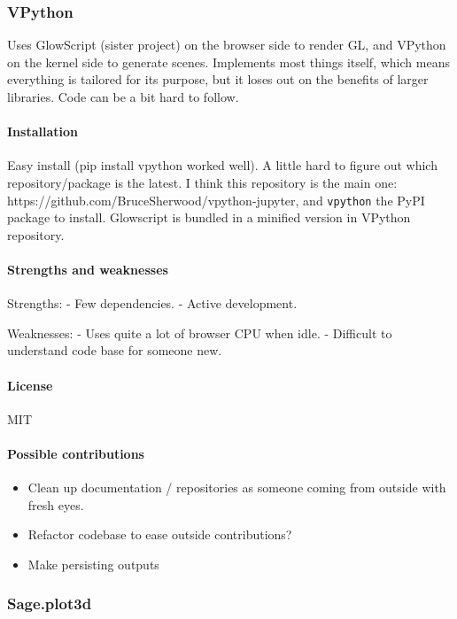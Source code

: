 \subsubsection{VPython}

Uses GlowScript (sister project) on the browser side to render GL, and
VPython on the kernel side to generate scenes. Implements most things
itself, which means everything is tailored for its purpose, but it loses
out on the benefits of larger libraries. Code can be a bit hard to
follow.

\paragraph{Installation}

Easy install (pip install vpython worked well). A little hard to figure
out which repository/package is the latest. I think this repository is
the main one: https://github.com/BruceSherwood/vpython-jupyter, and
\texttt{vpython} the PyPI package to install. Glowscript is bundled in a
minified version in VPython repository.

\paragraph{Strengths and weaknesses}

Strengths: - Few dependencies. - Active development.

Weaknesses: - Uses quite a lot of browser CPU when idle. - Difficult to
understand code base for someone new.

\paragraph{License}

MIT

\paragraph{Possible contributions}

\begin{itemize}
\tightlist
\item
  Clean up documentation / repositories as someone coming from outside
  with fresh eyes.
\item
  Refactor codebase to ease outside contributions?
\item
  Make persisting outputs
\end{itemize}

\subsubsection{Sage.plot3d}

